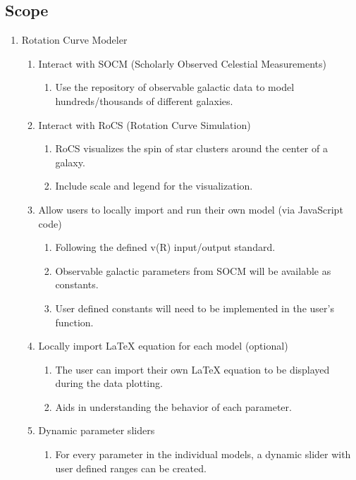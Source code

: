 \documentclass[titlepage]{article}
\begin{document}
\subsection{Scope}
\begin{enumerate}
	\item Rotation Curve Modeler
	
  \begin{enumerate}	 	
    \item Interact with SOCM (Scholarly Observed Celestial Measurements)
	\begin{enumerate}
		\item Use the repository of observable galactic data to model hundreds/thousands of different galaxies.
	\end{enumerate}
    \item Interact with RoCS (Rotation Curve Simulation)
	\begin{enumerate}
		\item RoCS visualizes the spin of star clusters around the center of a galaxy. 
		\item Include scale and legend for the visualization.
	\end{enumerate}
    \item Allow users to locally import and run their own model (via JavaScript code)
	\begin{enumerate}
		\item Following the defined v(R) input/output standard.
		\item Observable galactic parameters from SOCM will be available as constants.
		\item User defined constants will need to be implemented in the user's function.
	\end{enumerate}
    \item Locally import LaTeX equation for each model (optional)
	\begin{enumerate}
		\item The user can import their own LaTeX equation to be displayed during the data plotting.
		\item Aids in understanding the behavior of each parameter.
	\end{enumerate}
	\item Dynamic parameter sliders
	\begin{enumerate}
		\item For every parameter in the individual models, a dynamic slider with user defined ranges can be created.
	\end{enumerate}

\end{enumerate}
\end{enumerate}
\end{document}
